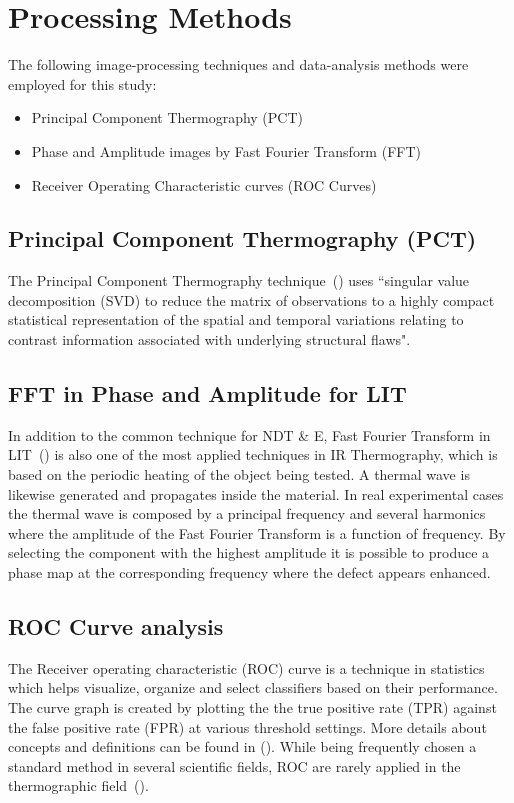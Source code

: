 


\section{Processing Methods} %
\label{sec:processing_methods}
The following image-processing techniques and data-analysis methods were employed for this study:
\begin{itemize}
   \item Principal Component Thermography (PCT)
   \item Phase and Amplitude images by Fast Fourier Transform (FFT)
   \item Receiver Operating Characteristic curves (ROC Curves)
\end{itemize}

\subsection{Principal Component Thermography (PCT)}
The Principal Component Thermography technique~(\citet{Rajic2002}) uses ``singular value decomposition (SVD) to reduce the matrix of observations to a highly compact statistical representation of the spatial and temporal variations relating to contrast information associated with underlying structural flaws".

\subsection{FFT in Phase and Amplitude for LIT}
In addition to the common technique for NDT \& E, Fast Fourier Transform in LIT~(\citet{wu1998lock}) is also one of the most applied techniques in IR Thermography, which is based on the periodic heating of the object being tested. A thermal wave is likewise generated and propagates inside the material. In real experimental cases the thermal wave is composed by a principal frequency and several harmonics where the amplitude of the Fast Fourier Transform is a function of frequency. By selecting the component with the highest amplitude it is possible to produce a phase map at the corresponding frequency where the defect appears enhanced.


\subsection{ROC Curve analysis} %
\label{sub:roc_curve_analysis}
The Receiver operating characteristic (ROC) curve is a technique in statistics which helps visualize, organize and select classifiers based on their performance. The curve graph is created by plotting the the true positive rate (TPR) against the false positive rate (FPR) at various threshold settings. More details about concepts and definitions can be found in (\citet{Fawcett2006}). While being frequently chosen a standard method in several scientific fields, ROC are rarely applied in the thermographic field~(\citet{Bison2014a}). 

